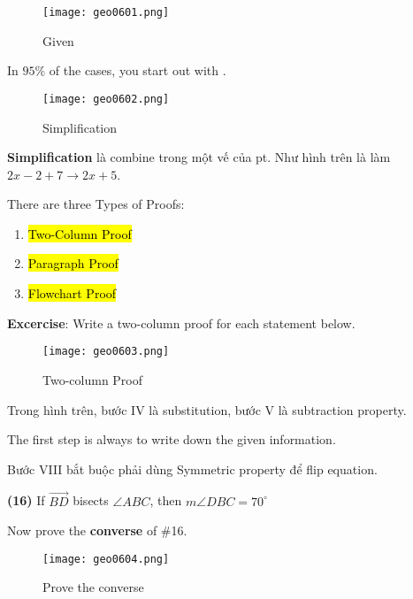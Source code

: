 \begin{figure}[htb!]
  \centering
  \texttt{[image: geo0601.png]}
  \caption{Given}
\end{figure}

In $95\%$ of the cases, you start out with .

\begin{figure}[htb!]
  \centering
  \texttt{[image: geo0602.png]}
  \caption{Simplification}
\end{figure}

\textbf{Simplification} là combine trong một vế của pt. Như hình trên là làm $2x-2+7 \rightarrow 2x+5$.

\vspace{.5cm}

There are three Types of Proofs:

\begin{enumerate}
  \item \hl{Two-Column Proof}
  \item \hl{Paragraph Proof}
  \item \hl{Flowchart Proof}
\end{enumerate}

\newpage

\textbf{Excercise}: Write a two-column proof for each statement below.

\begin{figure}[htb!]
  \centering
  \texttt{[image: geo0603.png]}
  \caption{Two-column Proof}
\end{figure}

Trong hình trên, bước IV là substitution, bước V là subtraction property.

The first step is always to write down the given information.

Bước VIII bắt buộc phải dùng Symmetric property để flip equation.

\vspace{.5cm}

\textbf{(16)} If $\overrightarrow{BD}$ bisects $\angle ABC$, then $m\angle DBC=70^{\circ}$

Now prove the \textbf{converse} of \#16.

\newpage

\begin{figure}[htb!]
  \centering
  \texttt{[image: geo0604.png]}
  \caption{Prove the converse}
\end{figure}

